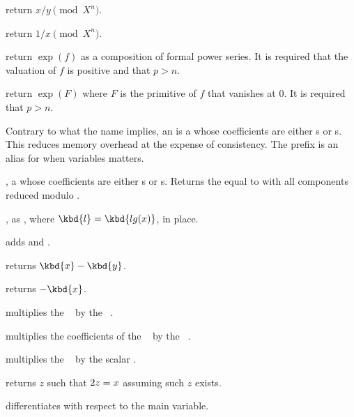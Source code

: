  return $x/y\pmod{X^n}$.

 return $1/x\pmod{X^n}$.

 return $\exp(f)$
as a composition of formal power series.
It is required that the valuation of $f$ is positive and that $p>n$.

 return $\exp(F)$
where $F$ is the primitive of $f$ that vanishes at $0$.
It is required that $p>n$.




Contrary to what the name implies, an  is a  whose
coefficients are either s or s. This reduces memory
overhead at the expense of consistency. The prefix  is an
alias for  when variables matters.

,  a  whose coefficients are
either s or s. Returns the  equal to  with
all components reduced modulo .

, as , where
$\kbd{l} = \kbd{lg(x)}$, in place.

 adds  and .

 returns $\kbd{x}-\kbd{y}$.

 returns $-\kbd{x}$.

 multiplies the ~
by the ~.

 multiplies the coefficients of the
~ by the ~.

 multiplies the ~
by the scalar .

 returns $z$ such that $2\*z = x$
assuming such $z$ exists.

 differentiates  with respect to
the main variable.

